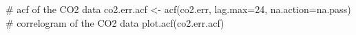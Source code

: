 \begin{Schunk}
\begin{Sinput}
 # acf of the CO2 data
 co2.err.acf <- acf(co2.err, lag.max=24, na.action=na.pass)
 # correlogram of the CO2 data
 plot.acf(co2.err.acf)
\end{Sinput}
\end{Schunk}
